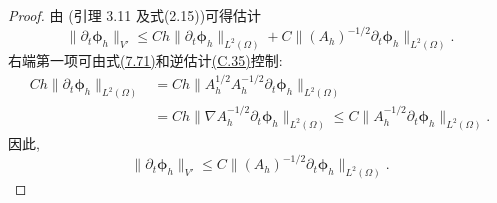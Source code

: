 \begin{proof}
由 \textcite{AyusoGarciaArchillaNovo2005}(引理 3.11 及式(2.15))可得估计
\[
  \|\partial_t\symbf{\phi}_h\|_{V'}
  \le Ch\|\partial_t\symbf{\phi}_h\|_{L^2(\Omega)}
       +C\|(A_h)^{-1/2}\partial_t\symbf{\phi}_h\|_{L^2(\Omega)}.
\]
右端第一项可由式\hyperref[eq:time-dependent-pressure-error-discrete-stokes-norm]{(7.71)}和逆估计\hyperref[eq:appendix-c-35]{(C.35)}控制:
\[
\begin{aligned}
  Ch\|\partial_t\symbf{\phi}_h\|_{L^2(\Omega)}
  &=Ch\|A_h^{1/2}A_h^{-1/2}
       \partial_t\symbf{\phi}_h\|_{L^2(\Omega)}\\
  &=Ch\|\nabla A_h^{-1/2}
       \partial_t\symbf{\phi}_h\|_{L^2(\Omega)}
   \le C\|A_h^{-1/2}\partial_t\symbf{\phi}_h\|_{L^2(\Omega)}.
\end{aligned}
\]
因此,
\begin{equation}\label{eq:time-dependent-pressure-error-time-derivative-negative-norm}
  \|\partial_t\symbf{\phi}_h\|_{V'}
  \le C\|(A_h)^{-1/2}\partial_t\symbf{\phi}_h\|_{L^2(\Omega)}.
\end{equation}


\end{proof}
